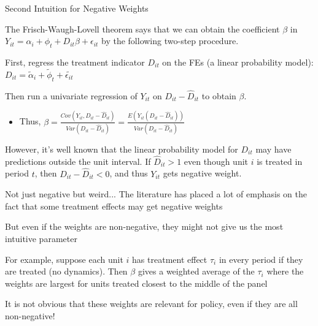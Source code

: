 \documentclass[aspectratio = 169, 13pt]{beamer}
\begin{document}
\begin{frame}{Second Intuition for Negative Weights}
	\begin{wideitemize}
		\item
		The Frisch-Waugh-Lovell theorem says that we can obtain the coefficient $\beta$ in 	
		$Y_{it} = \alpha_i + \phi_t + D_{it} \beta  + \epsilon_{it}$ by the following two-step procedure. 
		
		\item
		First, regress the treatment indicator $D_{it}$ on the FEs (a linear probability model): $D_{it} = \tilde{\alpha}_i + \tilde{\phi}_t + \tilde{\epsilon_{it}} $
		
		\item
		
		\noindent Then run a univariate regression of $Y_{it}$ on $D_{it}-\hat{D}_{it}$ to obtain $\beta$.
		
		\begin{itemize}
			\item 
			Thus, $\beta = \frac{Cov( Y_{it}, D_{it} - \hat{D}_{it} )}{ Var(D_{it} - \hat{D}_{it})  } =  \frac{E( Y_{it} (D_{it} - \hat{D}_{it})) }{ Var(D_{it} - \hat{D}_{it})  }$
		\end{itemize}
		
		\item
		However, it's well known that the linear probability model for $D_{it}$ may have predictions outside the unit interval. If $\hat{D}_{it}>1$ even though unit $i$ is treated in period $t$, then $D_{it}- \hat{D}_{it} <0$, and thus $Y_{it}$ gets negative weight. 
	\end{wideitemize}
\end{frame}

\begin{frame}{Not just negative but weird...}
  The literature has placed a lot of emphasis on the fact that some treatment effects may get negative weights
  \begin{wideitemize}
    \item
    But even if the weights are non-negative, they might not give us the most intuitive parameter

    \item
    For example, suppose each unit $i$ has treatment effect $\tau_i$ in every period if they are treated (no dynamics). Then $\beta$ gives a weighted average of the $\tau_i$ where the weights are largest for units treated closest to the middle of the panel

    \item
    It is not obvious that these weights are relevant for policy, even if they are all non-negative!
  \end{wideitemize}
\end{frame}
\end{document}
